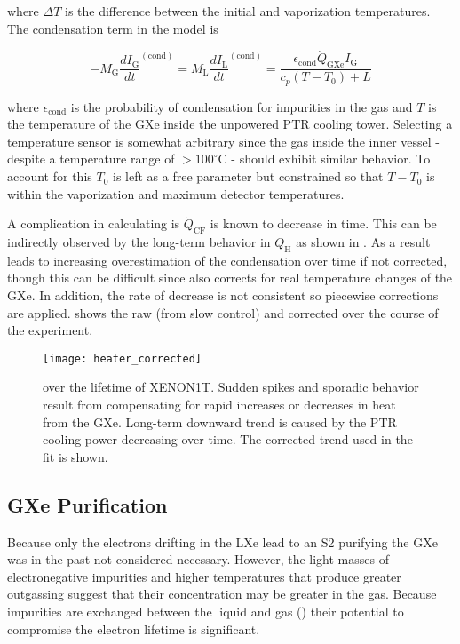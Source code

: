 \noindent where $\Delta T$ is the difference between the initial and vaporization temperatures.  The condensation term in the model is

\vspace{-10pt}

\begin{equation}
-M_{\mathrm{G}} \frac{dI_{\mathrm{G}}}{dt}^{(\mathrm{cond})} = M_{\mathrm{L}} \frac{dI_{\mathrm{L}}}{dt}^{(\mathrm{cond})} =
\frac{\epsilon_{\mathrm{cond}} \dot{Q}_{\mathrm{GXe}} I_{\mathrm{G}}}{c_p (T - T_0) + L}
\end{equation}

\noindent where $\epsilon_{\mathrm{cond}}$ is the probability of condensation for impurities in the gas and $T$ is the temperature of
the GXe inside the unpowered PTR cooling tower.  Selecting a temperature sensor is somewhat arbitrary since the gas inside the inner
vessel - despite a temperature range of $> 100^{\circ}\mathrm{C}$ - should exhibit similar behavior.  To account for this $T_0$ is left as
a free parameter but constrained so that $T - T_0$ is within the vaporization and maximum detector temperatures.

A complication in calculating \qdg is $\dot{Q}_{\mathrm{CF}}$ is known to decrease in time.  This can be indirectly observed by
the long-term behavior in $\dot{Q}_{\mathrm{H}}$ as shown in .  As a result
 leads to increasing overestimation of the condensation over time if not
corrected, though this can be difficult since \qdh also corrects for real temperature changes of the
GXe.  In addition, the rate of decrease is not consistent so piecewise corrections are
applied.   shows the raw (from slow control) and corrected \qdh over the course of
the experiment.

\begin{figure}
\centering
\texttt{[image: heater\_corrected]}
\caption{\qdh over the lifetime of XENON1T.  Sudden spikes and sporadic behavior result from compensating for rapid increases or decreases
in heat from the GXe.  Long-term downward trend is caused by the PTR cooling power decreasing over time.  The corrected trend
used in the fit is shown.}
\label{fig:electron_lifetime_model_vap_and_cond_heater_all}
\end{figure}



\subsection{GXe Purification}
\label{subsec:electron_lifetime_model_gxe}
Because only the electrons drifting in the LXe lead to an S2 purifying the GXe was in the past not considered necessary.  However,
the light masses of electronegative impurities and higher temperatures that produce greater outgassing
suggest that their concentration may be greater in the gas.  Because
impurities are exchanged between the liquid and gas () their potential to compromise
the electron lifetime is significant.

